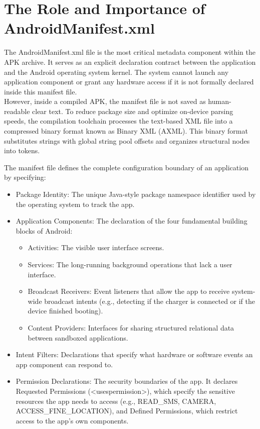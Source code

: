 \section{The Role and Importance of AndroidManifest.xml}
The AndroidManifest.xml file is the most critical metadata component within the APK archive. It serves as an explicit declaration contract between the application and the Android operating system kernel. The system cannot launch any application component or grant any hardware access if it is not formally declared inside this manifest file.\\

However, inside a compiled APK, the manifest file is not saved as human-readable clear text. To reduce package size and optimize on-device parsing speeds, the compilation toolchain processes the text-based XML file into a compressed binary format known as Binary XML (AXML). This binary format substitutes strings with global string pool offsets and organizes structural nodes into tokens.

The manifest file defines the complete configuration boundary of an application by specifying:\begin{itemize}


 \item Package Identity: The unique Java-style package namespace identifier used by the operating system to track the app.

 \item Application Components: The declaration of the four fundamental building blocks of Android:\begin{itemize}
 

 \item Activities: The visible user interface screens.

 \item Services: The long-running background operations that lack a user interface.

 \item Broadcast Receivers: Event listeners that allow the app to receive system-wide broadcast intents (e.g., detecting if the charger is connected or if the device finished booting).

 \item Content Providers: Interfaces for sharing structured relational data between sandboxed applications.
 \end{itemize}

 \item Intent Filters: Declarations that specify what hardware or software events an app component can respond to.

 \item Permission Declarations: The security boundaries of the app. It declares Requested Permissions (<uses\-permission>), which specify the sensitive resources the app needs to access (e.g., READ\_SMS, CAMERA, ACCESS\_FINE\_LOCATION), and Defined Permissions, which restrict access to the app's own components.

\end{itemize}

